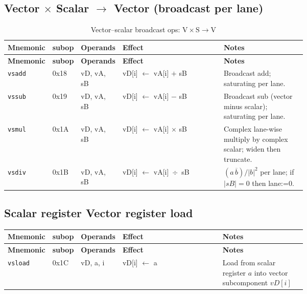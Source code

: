 \documentclass[10pt]{article}
\begin{document}
\subsection*{Vector $\times$ Scalar $\to$ Vector (broadcast per lane)}
\begin{longtable}{@{}l l l L{0.38\linewidth} L{0.30\linewidth}@{}}
\caption{Vector–scalar broadcast ops: $\mathrm{V}\times\mathrm{S} \to \mathrm{V}$}\label{tab:vs_to_v}\\
\toprule
\textbf{Mnemonic} & \textbf{subop} & \textbf{Operands} & \textbf{Effect} & \textbf{Notes} \\
\midrule
\endfirsthead
\toprule
\textbf{Mnemonic} & \textbf{subop} & \textbf{Operands} & \textbf{Effect} & \textbf{Notes} \\
\midrule
\endhead
\texttt{vsadd} & 0x18 & vD, vA, sB & vD[i] $\leftarrow$ vA[i] $+$ sB
  & Broadcast add; saturating per lane. \\
\texttt{vssub} & 0x19 & vD, vA, sB & vD[i] $\leftarrow$ vA[i] $-$ sB
  & Broadcast sub (vector minus scalar); saturating per lane. \\
\texttt{vsmul} & 0x1A & vD, vA, sB & vD[i] $\leftarrow$ vA[i] $\times$ sB
  & Complex lane-wise multiply by complex scalar; widen then truncate. \\
\texttt{vsdiv} & 0x1B & vD, vA, sB & vD[i] $\leftarrow$ vA[i] \,$\div$\, sB
  & $(a\,\overline{b})/|b|^2$ per lane; if $|sB|{=}0$ then lane:=0. \\
\bottomrule
\end{longtable}
\newpage
\subsection*{Scalar register Vector register load}
\begin{longtable}{@{}l l l L{0.38\linewidth} L{0.30\linewidth}@{}}
\toprule
\textbf{Mnemonic} & \textbf{subop} & \textbf{Operands} & \textbf{Effect} & \textbf{Notes} \\
\midrule
\endfirsthead
\toprule
\textbf{Mnemonic} & \textbf{subop} & \textbf{Operands} & \textbf{Effect} & \textbf{Notes} \\
\midrule
\endhead
\texttt{vsload} & 0x1C & vD, a, i & vD[i] $\leftarrow$ a
  & Load from scalar register $a$ into vector subcomponent $vD[i]$ \\
\bottomrule
\end{longtable}

\end{document}
